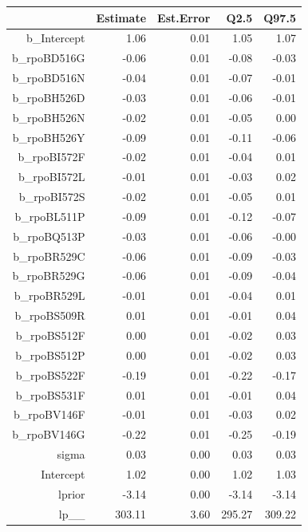 \begin{table}[ht]
\centering
\begin{tabular}{rrrrr}
  \hline
 & Estimate & Est.Error & Q2.5 & Q97.5 \\ 
  \hline
b\_Intercept & 1.06 & 0.01 & 1.05 & 1.07 \\ 
  b\_rpoBD516G & -0.06 & 0.01 & -0.08 & -0.03 \\ 
  b\_rpoBD516N & -0.04 & 0.01 & -0.07 & -0.01 \\ 
  b\_rpoBH526D & -0.03 & 0.01 & -0.06 & -0.01 \\ 
  b\_rpoBH526N & -0.02 & 0.01 & -0.05 & 0.00 \\ 
  b\_rpoBH526Y & -0.09 & 0.01 & -0.11 & -0.06 \\ 
  b\_rpoBI572F & -0.02 & 0.01 & -0.04 & 0.01 \\ 
  b\_rpoBI572L & -0.01 & 0.01 & -0.03 & 0.02 \\ 
  b\_rpoBI572S & -0.02 & 0.01 & -0.05 & 0.01 \\ 
  b\_rpoBL511P & -0.09 & 0.01 & -0.12 & -0.07 \\ 
  b\_rpoBQ513P & -0.03 & 0.01 & -0.06 & -0.00 \\ 
  b\_rpoBR529C & -0.06 & 0.01 & -0.09 & -0.03 \\ 
  b\_rpoBR529G & -0.06 & 0.01 & -0.09 & -0.04 \\ 
  b\_rpoBR529L & -0.01 & 0.01 & -0.04 & 0.01 \\ 
  b\_rpoBS509R & 0.01 & 0.01 & -0.01 & 0.04 \\ 
  b\_rpoBS512F & 0.00 & 0.01 & -0.02 & 0.03 \\ 
  b\_rpoBS512P & 0.00 & 0.01 & -0.02 & 0.03 \\ 
  b\_rpoBS522F & -0.19 & 0.01 & -0.22 & -0.17 \\ 
  b\_rpoBS531F & 0.01 & 0.01 & -0.01 & 0.04 \\ 
  b\_rpoBV146F & -0.01 & 0.01 & -0.03 & 0.02 \\ 
  b\_rpoBV146G & -0.22 & 0.01 & -0.25 & -0.19 \\ 
  sigma & 0.03 & 0.00 & 0.03 & 0.03 \\ 
  Intercept & 1.02 & 0.00 & 1.02 & 1.03 \\ 
  lprior & -3.14 & 0.00 & -3.14 & -3.14 \\ 
  lp\_\_ & 303.11 & 3.60 & 295.27 & 309.22 \\ 
   \hline
\end{tabular}
\end{table}
